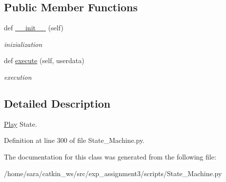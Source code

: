 \subsection*{Public Member Functions}
\begin{DoxyCompactItemize}
\item 
\mbox{\label{classState__Machine_1_1Play_a1f62c75a5c32f90ff7ee5aecd4111a0f}} 
def \hyperlink{classState__Machine_1_1Play_a1f62c75a5c32f90ff7ee5aecd4111a0f}{\+\_\+\+\_\+init\+\_\+\+\_\+} (self)
\begin{DoxyCompactList}\small\item\em inizialization \end{DoxyCompactList}\item 
\mbox{\label{classState__Machine_1_1Play_a8b230b99cd16a8349e08f2c110b66482}} 
def \hyperlink{classState__Machine_1_1Play_a8b230b99cd16a8349e08f2c110b66482}{execute} (self, userdata)
\begin{DoxyCompactList}\small\item\em execution \end{DoxyCompactList}\end{DoxyCompactItemize}


\subsection{Detailed Description}
\hyperlink{classState__Machine_1_1Play}{Play} State. 

Definition at line 300 of file State\+\_\+\+Machine.\+py.



The documentation for this class was generated from the following file\+:\begin{DoxyCompactItemize}
\item 
/home/sara/catkin\+\_\+ws/src/exp\+\_\+assignment3/scripts/State\+\_\+\+Machine.\+py\end{DoxyCompactItemize}
